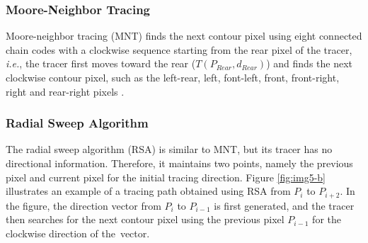 \documentclass[sensors,article,accept,moreauthors,pdftex,10pt,a4paper]{mdpi}
\newcommand{\JHMEMO}[1]{\textcolor{red}{#1}}
\begin{document}
\subsubsection{Moore-Neighbor Tracing}
Moore-neighbor tracing (MNT) finds the next contour pixel using eight connected chain codes with a clockwise sequence starting from the rear pixel of the tracer, \emph{i.e.}, the tracer first moves toward the rear ($T (P_{Rear}, d_{Rear})$) and finds the next clockwise contour pixel, such as the left-rear, left, font-left, front, front-right, right and rear-right pixels \cite{Toussaint????Grids, Ghuneim2015Contour}. 


\subsubsection{Radial Sweep Algorithm}

The radial sweep algorithm (RSA) \cite{Reddy2012Evaluation} is similar to MNT, but its tracer has no directional information. Therefore, it maintains two points, namely the previous pixel and current pixel for the initial tracing direction. Figure \ref{fig:img5-b} illustrates an example of a tracing path obtained using RSA from $P_i$ to $P_{i+2}$. In the figure, the direction vector from $P_i$ to $P_{i-1}$ is first generated, and the tracer then searches for the next contour pixel using the previous pixel $P_{i-1}$ for the clockwise direction of the~vector.
\end{document}
